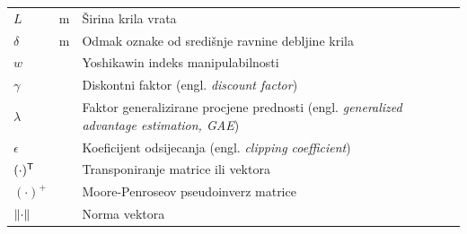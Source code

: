 \begin{longtable}{@{}p{}p{}p{}@{}}
    $L$                                & m                                & Širina krila vrata                                                                              \\
    $\delta$                           & m                                & Odmak oznake od središnje ravnine debljine krila                                                \\
    $w$                                &                                  & Yoshikawin indeks manipulabilnosti                                                              \\
    $\gamma$                           &                                  & Diskontni faktor (engl. \textit{discount factor})                                               \\
    $\lambda$                          &                                  & Faktor generalizirane procjene prednosti (engl. \textit{generalized advantage estimation, GAE}) \\
    $\epsilon$                         &                                  & Koeficijent odsijecanja (engl. \textit{clipping coefficient})                                   \\
    $(\cdot)^{\mathsf{T}}$                   &                                  & Transponiranje matrice ili vektora                                                              \\
    $\left( \cdot \right)^{+}$         &                                  & Moore-Penroseov pseudoinverz matrice                                                            \\
    $\left\lVert \cdot \right\rVert$                     &                                  & Norma vektora                                                                                   \\
    \bottomrule
\end{longtable}
\renewcommand{\arraystretch}{1}
\normalsize
\setcounter{table}{0}
\clearpage